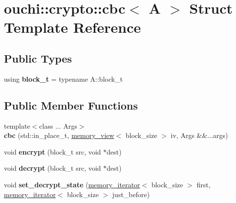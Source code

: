 \hypertarget{structouchi_1_1crypto_1_1cbc}{}\section{ouchi\+::crypto\+::cbc$<$ A $>$ Struct Template Reference}
\label{structouchi_1_1crypto_1_1cbc}
\subsection*{Public Types}
\begin{DoxyCompactItemize}
\item 
\mbox{\label{structouchi_1_1crypto_1_1cbc_a9501f9e8c036bd71508a31b0b0c24bd7}} 
using {\bfseries block\+\_\+t} = typename A\+::block\+\_\+t
\end{DoxyCompactItemize}
\subsection*{Public Member Functions}
\begin{DoxyCompactItemize}
\item 
\mbox{\label{structouchi_1_1crypto_1_1cbc_a8df641110dbf4ca38b0fa580383a132a}} 
{\footnotesize template$<$class ... Args$>$ }\\{\bfseries cbc} (std\+::in\+\_\+place\+\_\+t, \mbox{\hyperlink{classouchi_1_1crypto_1_1memory__view}{memory\+\_\+view}}$<$ block\+\_\+size $>$ iv, Args \&\&...args)
\item 
\mbox{\label{structouchi_1_1crypto_1_1cbc_a213b342339c47d47a33e767ee9fa0c29}} 
void {\bfseries encrypt} (block\+\_\+t src, void $\ast$dest)
\item 
\mbox{\label{structouchi_1_1crypto_1_1cbc_aab0ce198e591aea881e6904ed69fbcaf}} 
void {\bfseries decrypt} (block\+\_\+t src, void $\ast$dest)
\item 
\mbox{\label{structouchi_1_1crypto_1_1cbc_a8a2ebf875317b90bf4d6a993f8d5659a}} 
void {\bfseries set\+\_\+decrypt\+\_\+state} (\mbox{\hyperlink{structouchi_1_1crypto_1_1memory__iterator}{memory\+\_\+iterator}}$<$ block\+\_\+size $>$ first, \mbox{\hyperlink{structouchi_1_1crypto_1_1memory__iterator}{memory\+\_\+iterator}}$<$ block\+\_\+size $>$ just\+\_\+before)
\end{DoxyCompactItemize}

